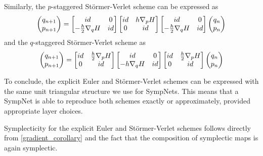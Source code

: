 \documentclass[twoside,a4paper]{article}
\begin{document}
Similarly, the $p$-staggered Störmer-Verlet scheme can be expressed as
\begin{equation*}
	\begin{pmatrix}
		q_{n+1} \\
		p_{n+1}
	\end{pmatrix} =
	\begin{bmatrix}
		id & 0 \\
		-\frac{h}{2} \grad[q]{H} & id
	\end{bmatrix}
	\begin{bmatrix}
		id & h \grad[p]{H} \\
		0 & id
	\end{bmatrix}
	\begin{bmatrix}
		id & 0 \\
		-\frac{h}{2} \grad[q]{H} & id
	\end{bmatrix}
	\begin{pmatrix}
		q_{n} \\
		p_{n}
	\end{pmatrix}
\end{equation*}
and the $q$-staggered Störmer-Verlet scheme as
\begin{equation*}
	\begin{pmatrix}
		q_{n+1} \\
		p_{n+1}
	\end{pmatrix} =
	\begin{bmatrix}
		id & \frac{h}{2} \grad[p]{H} \\
		0 & id
	\end{bmatrix}
	\begin{bmatrix}
		id & 0 \\
		-h \grad[q]{H} & id
	\end{bmatrix}
	\begin{bmatrix}
		id & \frac{h}{2} \grad[p]{H} \\
		0 & id
	\end{bmatrix}
	\begin{pmatrix}
		q_{n} \\
		p_{n}
	\end{pmatrix}
\end{equation*}

To conclude, the explicit Euler and Störmer-Verlet schemes can be expressed with
the same unit triangular structure we use for SympNets. This means that a SympNet is able
to reproduce both schemes exactly or approximately, provided appropriate layer choices.

Symplecticity for the explicit Euler and Störmer-Verlet schemes follows directly 
from \cref{gradient_corollary} and the fact that the composition of symplectic maps is again symplectic.
\end{document}
